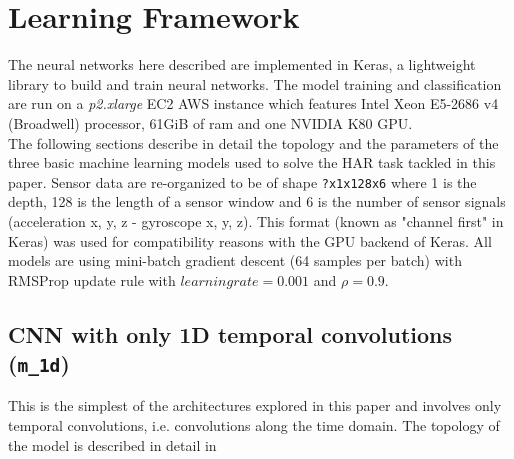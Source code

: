 \section{Learning Framework}
\label{sec:learning_framework}

The neural networks here described are implemented in Keras, a lightweight library to build and train neural networks. The model training and classification are run on a {\it p2.xlarge} EC2 AWS instance which features Intel Xeon E5-2686 v4 (Broadwell) processor, 61GiB of ram and one NVIDIA K80 GPU. \\
The following sections describe in detail the topology and the parameters of the three basic machine learning models used to solve the HAR task tackled in this paper.
Sensor data are \mbox{re-organized} to be of shape \texttt{?x1x128x6} where 1 is the depth, 128 is the length of a sensor window and 6 is the number of sensor signals (acceleration x, y, z - gyroscope x, y, z). This format (known as "channel first" in Keras) was used for compatibility reasons with the GPU backend of Keras. All models are using mini-batch gradient descent (64 samples per batch) with RMSProp update rule with $ learningrate=0.001$ and $\rho=0.9$.

\subsection{CNN with only 1D temporal convolutions (\texttt{m_1d})}
\label{sec:m_1d}
This is the simplest of the architectures explored in this paper and involves only temporal convolutions, i.e. convolutions along the time domain. The topology of the model is described in detail in 

\begin{table}[!htbp]
\captionsetup{font=scriptsize, justification=centering}
\centering
{}
\caption{\texttt{m_1d} model representation. Each \texttt{Conv} layer is made of (i) a convolution layer, (ii) a batch normalization and (iii) a ReLU activation. \texttt{D.M.} stands for dropout and max pooling, \texttt{D} stands for dropout. All dropout layers were set to 0.3 except the last one, set to 0.2.}
\label{m_1d_table}
\end{table}

